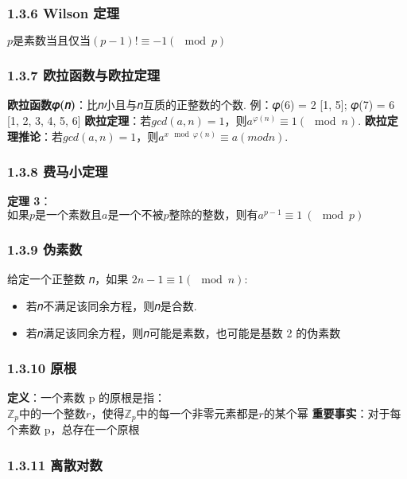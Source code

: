 \subsubsection{1.3.6 Wilson 定理}\label{wilson-ux5b9aux7406}

\(p是素数当且仅当 (p − 1)! ≡ −1(\mod p)\)

\subsubsection{1.3.7
欧拉函数与欧拉定理}\label{ux6b27ux62c9ux51fdux6570ux4e0eux6b27ux62c9ux5b9aux7406}

\textbf{欧拉函数𝜑(𝑛)}：比𝑛小且与𝑛互质的正整数的个数. 例：𝜑(6) = 2 {[}1,
5{]}; 𝜑(7) = 6 {[}1, 2, 3, 4, 5, 6{]}
\textbf{欧拉定理}：\(若 gcd(a, 𝑛) = 1，则a^{𝜑(n)} ≡ 1 (\mod 𝑛).\)
\textbf{欧拉定理推论}：\(若 gcd(a, 𝑛) = 1，则a^{x\mod 𝜑(n)} ≡ a (mod 𝑛).\)

\subsubsection{1.3.8 费马小定理}\label{ux8d39ux9a6cux5c0fux5b9aux7406}

\textbf{定理
3}：\(如果 p 是一个素数且 a 是一个不被 p 整除的整数， 则有 a^{p-1} ≡ 1\ (\mod p)\)

\subsubsection{1.3.9 伪素数}\label{ux4f2aux7d20ux6570}

给定一个正整数 𝑛，如果 \(2n-1 ≡ 1 (\mod n)\):

\begin{itemize}
\tightlist
\item
  若𝑛不满足该同余方程，则𝑛是合数.
\item
  若𝑛满足该同余方程，则𝑛可能是素数，也可能是基数 2 的伪素数
\end{itemize}

\subsubsection{1.3.10 原根}\label{ux539fux6839}

\textbf{定义}：一个素数 p 的原根是指：
\(ℤ_p中的一个整数 𝑟，使得 ℤ_p中的每一个非零元素都是 𝑟 的某个幂\)
\textbf{重要事实}：对于每个素数 p，总存在一个原根

\subsubsection{1.3.11 离散对数}\label{ux79bbux6563ux5bf9ux6570}

